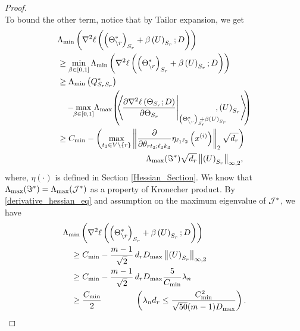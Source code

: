 \begin{proof}
\begin{equation}
\nonumber
\end{equation}
To bound the other term, notice that by Tailor expansion, we get
\begin{equation}
\begin{aligned}
&\Lambda_{\min}\left(\nabla^2\ell\left(\left(\Theta^*_{\backslash\svert}\right)_{\support_\svert}+\beta\left(U\right)_{\support_\svert};D\right)\right)\\ &\geq \min_{\beta\in[0,1]}\Lambda_{\min}\left(\nabla^2\ell\left(\left(\Theta^*_{\backslash\svert}\right)_{\support_\svert}+\beta\left(U\right)_{\support_\svert};D\right)\right)\\
&\geq \Lambda_{\min}\left(\fisher^*_{\support_\svert\support_\svert}\right)\\ &\quad-\!\!\max_{\beta\in[0,1]}\!\Lambda_{\max}\! \left(\!\!\tr{\!\frac{\partial\nabla^2\ell\left(\Theta_{\support_\svert};D\right)} {\partial\Theta_{\support_\svert}}\Biggr|_{\left(\Theta^*_{\backslash\svert}\right)_{\support_\svert}\!\!\!\!\!+\beta\left(U\right)_{\support_\svert}\!\!\!\!\!}\!\!\!\!} {\left(U\right)_{\support_\svert}}\!\!\right)\\
&\geq C_{\min} - \left(\max_{t_3\in\vertex\backslash\{\svert\}} \norm{\frac{\partial}{\partial\theta_{\svert t_3;\ell_3k_3}}\eta_{\ell_1\ell_2}\left(x^{(i)}\right)}{2}\sqrt{d_\svert}\right)\\ &\qquad\qquad\qquad\qquad\qquad\quad\!\!\Lambda_{\max}(\Im^*) \sqrt{d_\svert} \norm{\left(U\right)_{\support_\svert}}{\infty,2}\!,
\end{aligned}
\label{sim_analysis}
\end{equation}
where, $\eta(\cdot)$ is defined in Section \ref{Hessian_Section}. We know that $\Lambda_{\max}(\Im^*)=\Lambda_{\max}(\mathcal{J}^*)$ as a property of Kronecher product. By \eqref{derivative_hessian_eq} and assumption on the maximum eigenvalue of $\mathcal{J}^*$, we have
\begin{equation}
\begin{aligned}
&\Lambda_{\min}\left(\nabla^2\ell\left(\left(\Theta^*_{\backslash\svert}\right)_{\support_\svert}+\beta\left(U\right)_{\support_\svert};D\right)\right)\\ &\quad\geq C_{\min} - \frac{m-1}{\sqrt{2}} \, d_\svert D_{\max}\norm{\left(U\right)_{\support_\svert}}{\infty,2}\\
&\quad\geq C_{\min} - \frac{m-1}{\sqrt{2}} \, d_\svert D_{\max}  \frac{5}{C_{\min}} \regpar_n\\
&\quad\geq \frac{C_{\min}}{2}\qquad\qquad \left(\regpar_n d_\svert\leq\frac{C_{\min}^2}{\sqrt{50}(m-1)D_{\max}}\right).

\end{aligned}
\end{equation}
\end{proof}
